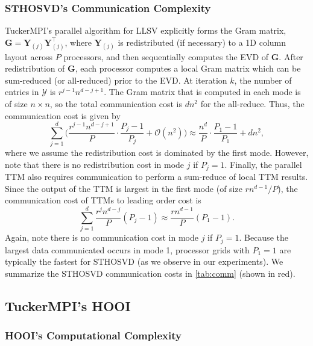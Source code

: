     \subsubsection{STHOSVD's Communication Complexity}

        TuckerMPI's parallel algorithm for LLSV explicitly forms the Gram
        matrix, $\mathbf{G} = \mathbf{Y}_{(j)}\mathbf{Y}_{(j)}^\intercal$,
        where $\mathbf{Y}_{(j)}$ is redistributed (if necessary) to a 1D column
        layout across $P$ processors, and then sequentially computes the EVD of
        $\mathbf{G}$. After redistribution of $\mathbf{G}$, each processor
        computes a local Gram matrix which can be sum-reduced (or all-reduced)
        prior to the EVD. At iteration $k$, the number of entries in
        $\mathcal{Y}$ is $r^{j-1}n^{d-j+1}$. The Gram matrix that is computed in
        each mode is of size $n \times n$, so the total communication cost is
        $dn^2$ for the all-reduce. Thus, the communication cost is given by
        \begin{equation*}
            \sum_{j=1}^{d} \bigg(\frac{r^{j-1}n^{d-j+1}}{P}\cdot \frac{P_j - 1}{P_j} + \mathcal{O}(n^2)\bigg) \approx \frac{n^{d}}{P}\cdot \frac{P_1 - 1}{P_1} + dn^2,
        \end{equation*}
        where we assume the redistribution cost is dominated by the first mode. However,
        note that there is no redistribution cost in mode $j$ if $P_j=1$. Finally, the
        parallel TTM also requires communication to perform a sum-reduce of local TTM
        results. Since the output of the TTM is largest in the first mode (of size
        $rn^{d-1}/P$), the communication cost of TTMs to leading order cost is
        \begin{equation*}
            \sum_{j=1}^{d} \frac{r^{j}n^{d-j}}{P}(P_j - 1) \approx \frac{rn^{d-1}}{P}(P_1 - 1).
        \end{equation*}
        Again, note there is no communication cost in mode $j$ if $P_j=1$.
        Because the largest data communicated occurs in mode 1, processor grids
        with $P_1=1$ are typically the fastest for STHOSVD (as we observe in our
        experiments). We summarize the STHOSVD communication costs in
        \cref{tab:comm} (shown in red).

\subsection{TuckerMPI's HOOI}
    \subsubsection{HOOI's Computational Complexity}

